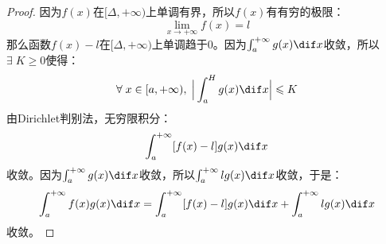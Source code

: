 \begin{proof}
	因为$f(x)$在$[\Delta,+\infty)$上单调有界，所以$f(x)$有有穷的极限：
	\begin{equation*}
		\lim_{x\to+\infty}f(x)=l
	\end{equation*}
	那么函数$f(x)-l$在$[\Delta,+\infty)$上单调趋于$0$。因为$\int_{a}^{+\infty}g(x)\dif x$收敛，所以$\exists\;K\geqslant0$使得：
	\begin{equation*}
		\forall\;x\in[a,+\infty),\;\Big|\int_{a}^{H}g(x)\dif x\Big|\leqslant K
	\end{equation*}
	由Dirichlet判别法，无穷限积分：
	\begin{equation*}
		\int_{a}^{+\infty}[f(x)-l]g(x)\dif x
	\end{equation*}
	收敛。因为$\int_{a}^{+\infty}g(x)\dif x$收敛，所以$\int_{a}^{+\infty}lg(x)\dif x$收敛，于是：
	\begin{equation*}
		\int_{a}^{+\infty}f(x)g(x)\dif x=\int_{a}^{+\infty}[f(x)-l]g(x)\dif x+\int_{a}^{+\infty}lg(x)\dif x
	\end{equation*}
	收敛。
\end{proof}